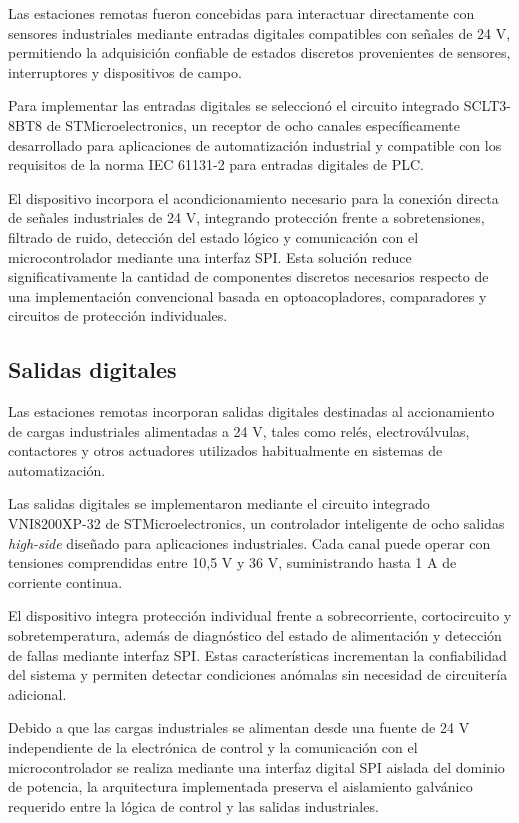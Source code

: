 Las estaciones remotas fueron concebidas para interactuar directamente con sensores industriales mediante entradas digitales compatibles con señales de 24 V, permitiendo la adquisición confiable de estados discretos provenientes de sensores, interruptores y dispositivos de campo.

Para implementar las entradas digitales se seleccionó el circuito integrado SCLT3-8BT8 de STMicroelectronics, un receptor de ocho canales específicamente desarrollado para aplicaciones de automatización industrial y compatible con los requisitos de la norma IEC 61131-2 \cite{iec61131_2} para entradas digitales de PLC.

El dispositivo incorpora el acondicionamiento necesario para la conexión directa de señales industriales de 24 V, integrando protección frente a sobretensiones, filtrado de ruido, detección del estado lógico y comunicación con el microcontrolador mediante una interfaz SPI. Esta solución reduce significativamente la cantidad de componentes discretos necesarios respecto de una implementación convencional basada en optoacopladores, comparadores y circuitos de protección individuales.

\subsection{Salidas digitales}

Las estaciones remotas incorporan salidas digitales destinadas al accionamiento de cargas industriales alimentadas a 24 V, tales como relés, electroválvulas, contactores y otros actuadores utilizados habitualmente en sistemas de automatización.

Las salidas digitales se implementaron mediante el circuito integrado VNI8200XP-32 de STMicroelectronics, un controlador inteligente de ocho salidas \textit{high-side} diseñado para aplicaciones industriales. Cada canal puede operar con tensiones comprendidas entre 10,5 V y 36 V, suministrando hasta 1 A de corriente continua.

El dispositivo integra protección individual frente a sobrecorriente, cortocircuito y sobretemperatura, además de diagnóstico del estado de alimentación y detección de fallas mediante interfaz SPI. Estas características incrementan la confiabilidad del sistema y permiten detectar condiciones anómalas sin necesidad de circuitería adicional.

Debido a que las cargas industriales se alimentan desde una fuente de 24 V independiente de la electrónica de control y la comunicación con el microcontrolador se realiza mediante una interfaz digital SPI aislada del dominio de potencia, la arquitectura implementada preserva el aislamiento galvánico requerido entre la lógica de control y las salidas industriales.

